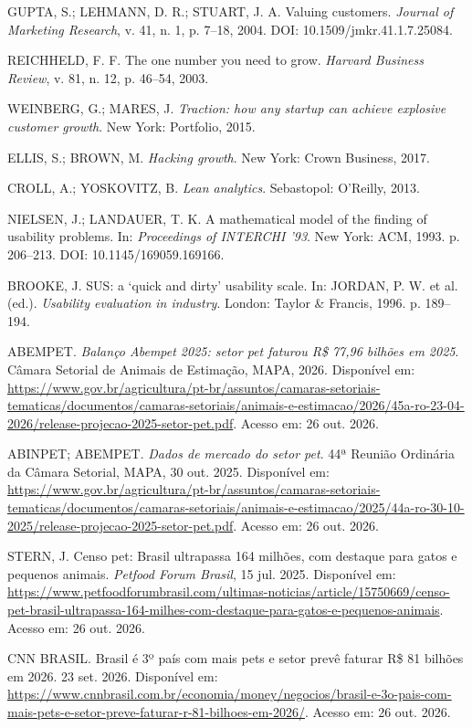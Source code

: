 \begin{enumerate}[label={[\arabic*]},leftmargin=1.1cm,itemsep=0.35em]
\item GUPTA, S.; LEHMANN, D. R.; STUART, J. A. Valuing customers. \textit{Journal of Marketing Research}, v. 41, n. 1, p. 7--18, 2004. DOI: 10.1509/jmkr.41.1.7.25084.
\item REICHHELD, F. F. The one number you need to grow. \textit{Harvard Business Review}, v. 81, n. 12, p. 46--54, 2003.
\item WEINBERG, G.; MARES, J. \textit{Traction: how any startup can achieve explosive customer growth}. New York: Portfolio, 2015.
\item ELLIS, S.; BROWN, M. \textit{Hacking growth}. New York: Crown Business, 2017.
\item CROLL, A.; YOSKOVITZ, B. \textit{Lean analytics}. Sebastopol: O'Reilly, 2013.
\item NIELSEN, J.; LANDAUER, T. K. A mathematical model of the finding of usability problems. In: \textit{Proceedings of INTERCHI '93}. New York: ACM, 1993. p. 206--213. DOI: 10.1145/169059.169166.
\item BROOKE, J. SUS: a `quick and dirty' usability scale. In: JORDAN, P. W. et al. (ed.). \textit{Usability evaluation in industry}. London: Taylor \& Francis, 1996. p. 189--194.
\item ABEMPET. \textit{Balanço Abempet 2025: setor pet faturou R\$ 77,96 bilhões em 2025}. Câmara Setorial de Animais de Estimação, MAPA, 2026. Disponível em: \url{https://www.gov.br/agricultura/pt-br/assuntos/camaras-setoriais-tematicas/documentos/camaras-setoriais/animais-e-estimacao/2026/45a-ro-23-04-2026/release-projecao-2025-setor-pet.pdf}. Acesso em: 26 out. 2026.
\item ABINPET; ABEMPET. \textit{Dados de mercado do setor pet}. 44ª Reunião Ordinária da Câmara Setorial, MAPA, 30 out. 2025. Disponível em: \url{https://www.gov.br/agricultura/pt-br/assuntos/camaras-setoriais-tematicas/documentos/camaras-setoriais/animais-e-estimacao/2025/44a-ro-30-10-2025/release-projecao-2025-setor-pet.pdf}. Acesso em: 26 out. 2026.
\item STERN, J. Censo pet: Brasil ultrapassa 164 milhões, com destaque para gatos e pequenos animais. \textit{Petfood Forum Brasil}, 15 jul. 2025. Disponível em: \url{https://www.petfoodforumbrasil.com/ultimas-noticias/article/15750669/censo-pet-brasil-ultrapassa-164-milhes-com-destaque-para-gatos-e-pequenos-animais}. Acesso em: 26 out. 2026.
\item CNN BRASIL. Brasil é 3º país com mais pets e setor prevê faturar R\$ 81 bilhões em 2026. 23 set. 2026. Disponível em: \url{https://www.cnnbrasil.com.br/economia/money/negocios/brasil-e-3o-pais-com-mais-pets-e-setor-preve-faturar-r-81-bilhoes-em-2026/}. Acesso em: 26 out. 2026.

\end{enumerate}
